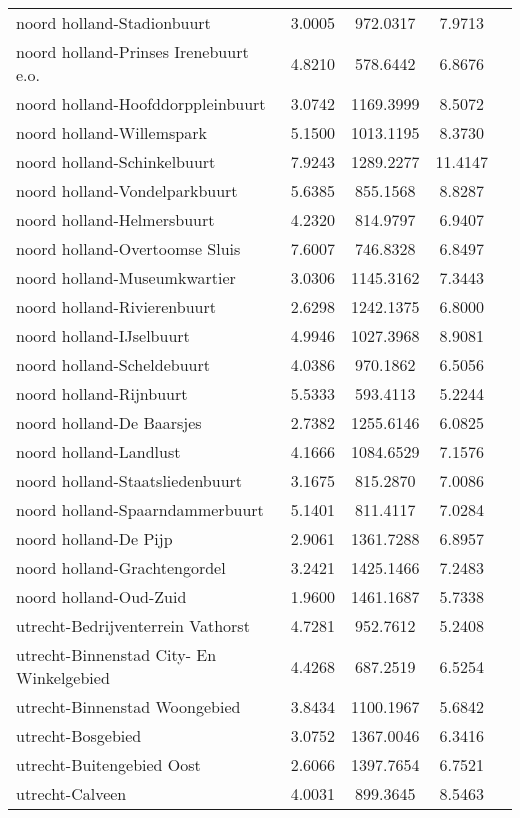 \begin{longtable}{llccc}
noord holland-Stadionbuurt & 3.0005 & 972.0317 & 7.9713 \\
noord holland-Prinses Irenebuurt e.o. & 4.8210 & 578.6442 & 6.8676 \\
noord holland-Hoofddorppleinbuurt & 3.0742 & 1169.3999 & 8.5072 \\
noord holland-Willemspark & 5.1500 & 1013.1195 & 8.3730 \\
noord holland-Schinkelbuurt & 7.9243 & 1289.2277 & 11.4147 \\
noord holland-Vondelparkbuurt & 5.6385 & 855.1568 & 8.8287 \\
noord holland-Helmersbuurt & 4.2320 & 814.9797 & 6.9407 \\
noord holland-Overtoomse Sluis & 7.6007 & 746.8328 & 6.8497 \\
noord holland-Museumkwartier & 3.0306 & 1145.3162 & 7.3443 \\
noord holland-Rivierenbuurt & 2.6298 & 1242.1375 & 6.8000 \\
noord holland-IJselbuurt & 4.9946 & 1027.3968 & 8.9081 \\
noord holland-Scheldebuurt & 4.0386 & 970.1862 & 6.5056 \\
noord holland-Rijnbuurt & 5.5333 & 593.4113 & 5.2244 \\
noord holland-De Baarsjes & 2.7382 & 1255.6146 & 6.0825 \\
noord holland-Landlust & 4.1666 & 1084.6529 & 7.1576 \\
noord holland-Staatsliedenbuurt & 3.1675 & 815.2870 & 7.0086 \\
noord holland-Spaarndammerbuurt & 5.1401 & 811.4117 & 7.0284 \\
noord holland-De Pijp & 2.9061 & 1361.7288 & 6.8957 \\
noord holland-Grachtengordel & 3.2421 & 1425.1466 & 7.2483 \\
noord holland-Oud-Zuid & 1.9600 & 1461.1687 & 5.7338 \\
utrecht-Bedrijventerrein Vathorst & 4.7281 & 952.7612 & 5.2408 \\
utrecht-Binnenstad City- En Winkelgebied & 4.4268 & 687.2519 & 6.5254 \\
utrecht-Binnenstad Woongebied & 3.8434 & 1100.1967 & 5.6842 \\
utrecht-Bosgebied & 3.0752 & 1367.0046 & 6.3416 \\
utrecht-Buitengebied Oost & 2.6066 & 1397.7654 & 6.7521 \\
utrecht-Calveen & 4.0031 & 899.3645 & 8.5463 \\

\end{longtable}
